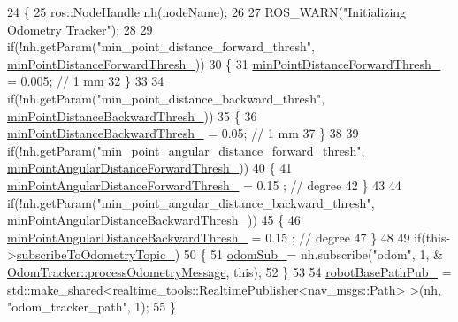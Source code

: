 \begin{DoxyCode}
24 \{
25     ros::NodeHandle nh(nodeName);
26 
27     ROS\_WARN(\textcolor{stringliteral}{"Initializing Odometry Tracker"});
28 
29     \textcolor{keywordflow}{if}(!nh.getParam(\textcolor{stringliteral}{"min\_point\_distance\_forward\_thresh"},
      \hyperlink{classsmacc__odom__tracker_1_1OdomTracker_a0017d7740d99c2cc8ba946495b96ce41}{minPointDistanceForwardThresh\_}))
30     \{
31         \hyperlink{classsmacc__odom__tracker_1_1OdomTracker_a0017d7740d99c2cc8ba946495b96ce41}{minPointDistanceForwardThresh\_} = 0.005; \textcolor{comment}{// 1 mm}
32     \}
33 
34     \textcolor{keywordflow}{if}(!nh.getParam(\textcolor{stringliteral}{"min\_point\_distance\_backward\_thresh"},
      \hyperlink{classsmacc__odom__tracker_1_1OdomTracker_a79d94520c5da1852602aaf264377a82f}{minPointDistanceBackwardThresh\_}))
35     \{
36         \hyperlink{classsmacc__odom__tracker_1_1OdomTracker_a79d94520c5da1852602aaf264377a82f}{minPointDistanceBackwardThresh\_} = 0.05; \textcolor{comment}{// 1 mm}
37     \}
38 
39     \textcolor{keywordflow}{if}(!nh.getParam(\textcolor{stringliteral}{"min\_point\_angular\_distance\_forward\_thresh"},
      \hyperlink{classsmacc__odom__tracker_1_1OdomTracker_a1611f6e11f48e8c2bdf6d16adf35fa2a}{minPointAngularDistanceForwardThresh\_}))
40     \{
41         \hyperlink{classsmacc__odom__tracker_1_1OdomTracker_a1611f6e11f48e8c2bdf6d16adf35fa2a}{minPointAngularDistanceForwardThresh\_} = 0.15 ; \textcolor{comment}{// degree}
42     \}
43 
44     \textcolor{keywordflow}{if}(!nh.getParam(\textcolor{stringliteral}{"min\_point\_angular\_distance\_backward\_thresh"},
      \hyperlink{classsmacc__odom__tracker_1_1OdomTracker_ac7cac171a63c8981f8233f71c94d0776}{minPointAngularDistanceBackwardThresh\_}))
45     \{
46         \hyperlink{classsmacc__odom__tracker_1_1OdomTracker_ac7cac171a63c8981f8233f71c94d0776}{minPointAngularDistanceBackwardThresh\_} = 0.15 ; \textcolor{comment}{// degree}
47     \}
48 
49     \textcolor{keywordflow}{if}(this->\hyperlink{classsmacc__odom__tracker_1_1OdomTracker_a394c4040c01f687c427d34c0ab50ba3e}{subscribeToOdometryTopic\_})
50     \{
51         \hyperlink{classsmacc__odom__tracker_1_1OdomTracker_a901bd60f4c1d21537a160d034ff504ef}{odomSub\_}= nh.subscribe(\textcolor{stringliteral}{"odom"}, 1, &
      \hyperlink{classsmacc__odom__tracker_1_1OdomTracker_adef7b87ba453ca86886239d875344de1}{OdomTracker::processOdometryMessage}, \textcolor{keyword}{this});
52     \}
53 
54     \hyperlink{classsmacc__odom__tracker_1_1OdomTracker_a32d060919f2630e0695ce016c0563a3f}{robotBasePathPub\_} = std::make\_shared<realtime\_tools::RealtimePublisher<nav\_msgs::Path>
      >(nh, \textcolor{stringliteral}{"odom\_tracker\_path"}, 1);
55 \}
\end{DoxyCode}


